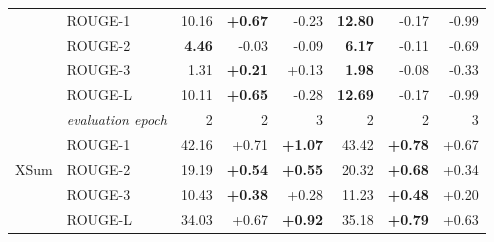 \begin{table}[b!]
{\begin{tabular}{llrrrrrr}
 &    ROUGE-1 & 10.16 &    \textbf{+0.67} &    -0.23 &  \textbf{12.80} &        -0.17 &        -0.99 \\
 &    ROUGE-2 &  \textbf{4.46} &    -0.03 &    -0.09 &   \textbf{6.17} &        -0.11 &        -0.69 \\
 &    ROUGE-3 &  1.31 &    \textbf{+0.21} &    +0.13 &   \textbf{1.98} &        -0.08 &        -0.33 \\
 &    ROUGE-L & 10.11 &    \textbf{+0.65} &    -0.28 &  \textbf{12.69} &        -0.17 &        -0.99 \\
 \midrule
\multirow{5}{*}{XSum \citep{narayan2018dont}} 
 & \textit{evaluation epoch} & 2 & 2 & 3 &  2 &  2 &  3 \\
 &    ROUGE-1 & 42.16 &     +0.71 &     \textbf{+1.07} &  43.42 &         \textbf{+0.78} &         +0.67 \\
 &    ROUGE-2 & 19.19 &     \textbf{+0.54} &     \textbf{+0.55} &  20.32 &         \textbf{+0.68} &         +0.34 \\
 &    ROUGE-3 & 10.43 &     \textbf{+0.38} &     +0.28 &  11.23 &         \textbf{+0.48} &         +0.20 \\
 &    ROUGE-L & 34.03 &     +0.67 &     \textbf{+0.92} &  35.18 &         \textbf{+0.79} &         +0.63 \\
\bottomrule
\end{tabular}
}







\end{table}




